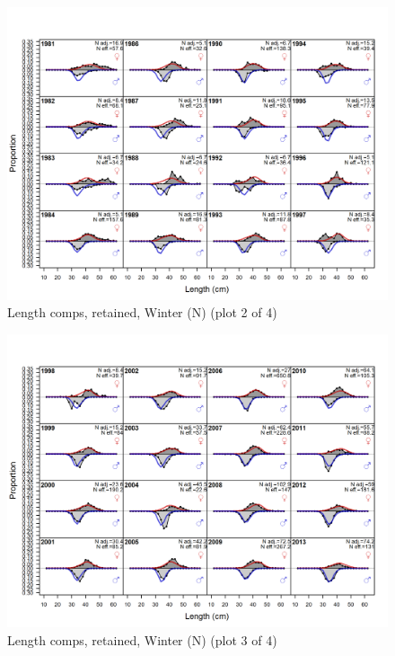 \documentclass[12pt,]{article}
\begin{document}
\begin{figure}
\centering
\includegraphics{r4ss/plots_mod1/comp_lenfit_flt1mkt2_page2.png}
\caption{Length comps, retained, Winter (N) (plot 2 of 4)
\label{fig:length_fits}}
\end{figure}

\begin{figure}
\centering
\includegraphics{r4ss/plots_mod1/comp_lenfit_flt1mkt2_page3.png}
\caption{Length comps, retained, Winter (N) (plot 3 of 4)
\label{fig:length_fits}}
\end{figure}
\end{document}
